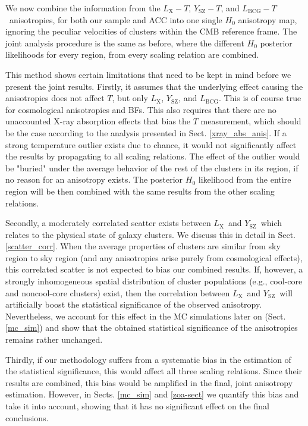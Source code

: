 \documentclass{aa}   %
\newcommand{\LT}{$L_{\text{X}}-T$}
\newcommand{\YT}{$Y_{\text{SZ}}-T$}
\newcommand{\LbcgT}{$L_{\text{BCG}}-T$}
\newcommand{\Lx}{$L_{\text{X}}$}
\newcommand{\Ysz}{$Y_{\text{SZ}}$}
\newcommand{\Lbcg}{$L_{\text{BCG}}$}
\begin{document}
We now combine the information from the \LT, \YT, and \LbcgT\ anisotropies, for both our sample and ACC into one single $H_0$ anisotropy map, ignoring the peculiar velocities of clusters within the CMB reference frame. The joint analysis procedure is the same as before, where the different $H_0$ posterior likelihoods for every region, from every scaling relation are combined. 

This method shows certain limitations that need to be kept in mind before we present the joint results. Firstly, it assumes that the underlying effect causing the anisotropies does not affect $T$, but only \Lx, \Ysz, and \Lbcg. This is of course true for cosmological anisotropies and BFs. This also requires that there are no unaccounted X-ray absorption effects that bias the $T$ measurement, which should be the case according to the analysis presented in Sect. \ref{xray_abs_anis}. If a strong temperature outlier exists due to chance, it would not significantly affect the results by propagating to all scaling relations. The effect of the outlier would be "buried" under the average behavior of the rest of the clusters in its region, if no reason for an anisotropy exists. The posterior $H_0$ likelihood from the entire region will be then combined with the same results from the other scaling relations.

 Secondly, a moderately correlated scatter exists between \Lx\ and \Ysz\ which relates to the physical state of galaxy clusters. We discuss this in detail in Sect. \ref{scatter_corr}. When the average properties of clusters are similar from sky region to sky region (and any anisotropies arise purely from cosmological effects), this correlated scatter is not expected to bias our combined results. If, however, a strongly inhomogeneous spatial distribution of cluster populations (e.g., cool-core and noncool-core clusters) exist, then the correlation between \Lx\ and \Ysz\ will artificially boost the statistical significance of the observed anisotropy. Nevertheless, we account for this effect in the MC simulations later on (Sect. \ref{mc_sim}) and show that the obtained statistical significance of the anisotropies remains rather unchanged.

Thirdly, if our methodology suffers from a systematic bias in the estimation of the statistical significance, this would affect all three scaling relations. Since their results are combined, this bias would be amplified in the final, joint anisotropy estimation. However, in Sects. \ref{mc_sim} and \ref{zoa-sect} we quantify this bias and take it into account, showing that it has no significant effect on the final conclusions.
\end{document}
